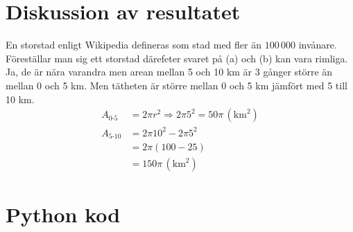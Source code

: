 \documentclass{article}
\begin{document}
\section*{Diskussion av resultatet}
En storstad enligt Wikipedia defineras som stad med fler än \( 100\,000 \)
invånare. Föreställar man sig ett storstad därefeter svaret på (a) och (b) kan
vara rimliga. Ja, de är nära varandra men arean mellan 5 och 10 km är 3 gånger
större än mellan 0 och 5 km. Men tätheten är större mellan 0 och 5 km jämfört
med 5 till 10 km.
\begin{align*}
	A_{\text{0-5}} &= 2\pi r^2	\Rightarrow 2\pi 5^2 = 50\pi
\, \left( \si{\kilo\meter}^2 \right) \\
	A_{\text{5-10}} &= 2\pi 10^2 - 2\pi 5^2 \\
			&= 2\pi(100 - 25) \\
			&= 150\pi \, \left( \si{\kilo\meter}^2 \right)
\end{align*}

\newpage
\appendix
\section{Python kod}
\label{app:python_code}

\end{document}
